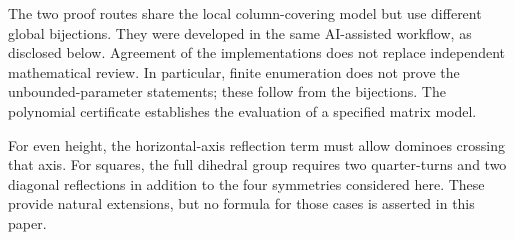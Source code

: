 The two proof routes share the local column-covering model
but use different global bijections. They were developed
in the same AI-assisted workflow, as disclosed below.
Agreement of the implementations does not replace independent
mathematical review.
In particular, finite enumeration does not prove the
unbounded-parameter statements; these follow from the
bijections. The polynomial certificate establishes the
evaluation of a specified matrix model.

For even height, the horizontal-axis reflection term must
allow dominoes crossing that axis. For squares, the full
dihedral group requires two quarter-turns and two diagonal
reflections in addition to the four symmetries considered here.
These provide natural extensions, but no formula for those
cases is asserted in this paper.
